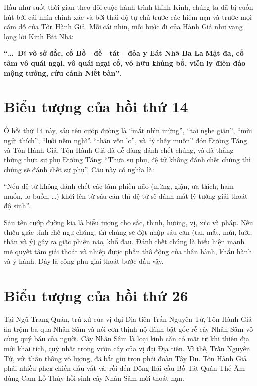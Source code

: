 Hầu như suốt thời gian theo dõi cuộc hành trình thỉnh Kinh, chúng ta đã bị cuốn hút bởi cái nhìn chính xác và bởi thái độ tự chủ trước các hiểm nạn và trước mọi cám dỗ của Tôn Hành Giả. Mỗi cái nhìn, mỗi bước đi của Hành Giả như vang lọng lời Kinh Bát Nhã:

{\bf ``\ldots ~Dĩ vô sở đắc, cố Bồ—đề—tát—đỏa y Bát Nhã Ba La Mật đa, cố tâm vô quái ngại, vô quái ngại cố, vô hữu khủng bố, viễn ly điên đảo mộng tưởng, cứu cánh Niết bàn''}.

\section{Biểu tượng của hồi thứ 14} %
\label{sec:bieu_tuong_cua_hoi_thu_14}

Ở hồi thứ 14 này, sáu tên cướp đường là ``mắt nhìn mừng'', ``tai nghe giận'', ``mũi ngửi thích'', ``lưỡi nếm nghĩ''. ``thân vốn lo'', và ``ý thấy muốn'' đón Đường Tăng và Tôn Hành Giả. Tôn Hành Giả đã dễ dàng đánh chết chúng, và đã thẳng thừng thưa sư phụ Đường Tăng: ``Thưa sư phụ, đệ tử không đánh chết chúng thì chúng sẽ đánh chết sư phụ''. Câu này có nghĩa là:

``Nếu đệ tử không đánh chết các tâm phiền não (mừng, giận, ưa thích, ham muốn, lo buồn, \ldots) khởi lên từ sáu căn thì đệ tử sẽ đánh mất lý tưởng giải thoát độ sinh''.

Sáu tên cướp đường kia là biểu tượng cho sắc, thinh, hương, vị, xúc và pháp. Nếu thiếu giác tỉnh chế ngự chúng, thì chúng sẽ đột nhập sáu căn (tai, mắt, mũi, lưỡi, thân và ý) gây ra giặc phiền não, khổ đau. Đánh chết chúng là biểu hiện mạnh mẽ quyết tâm giải thoát và nhiếp được phần thô động của thân hành, khẩu hành và ý hành. Đây là công phu giải thoát bước đầu vậy.

\section{Biểu tượng của hồi thứ 26} %
\label{sec:bieu_tuong_cua_hoi_thu_26}

Tại Ngũ Trang Quán, trú xứ của vị đại Địa tiên Trấn Nguyên Tử, Tôn Hành Giả ăn trộm ba quả Nhân Sâm và nổi cơn thịnh nộ đánh bật gốc rễ cây Nhân Sâm vô cùng quý báu của người. Cây Nhân Sâm là loại kinh căn có mặt từ khi thiên địa mới khai tích, quý nhất trong vườn cây của vị đại Địa tiên. Vì thế, Trấn Nguyên Tử, với thần thông vô lượng, đã bắt giữ trọn phái đoàn Tây Du. Tôn Hành Giả phải nhiều phen chiến đấu vất vả, rồi đến Đông Hải cầu Bồ Tát Quán Thế Âm dùng Cam Lồ Thủy hồi sinh cây Nhân Sâm mới thoát nạn.

